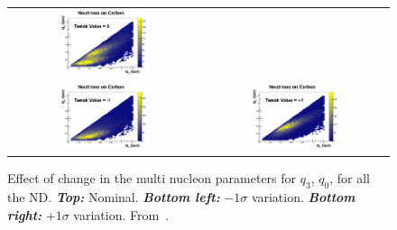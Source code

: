 \begin{figure}[ht]
  \begin{adjustbox}{center}
    \begin{tabular}{cc}
      \includegraphics[width=0.48\textwidth]{images/BANFF/neutrino_carbon_0.png} &\\
      \includegraphics[width=0.48\textwidth]{images/BANFF/neutrino_carbon_m3.png}&\includegraphics[width=0.48\textwidth]{images/BANFF/neutrino_carbon_p3.png}
    \end{tabular}
  \end{adjustbox}
  \begin{center}
    \caption[Effect of change in the multi nucleon parameters]{Effect
      of change in the multi nucleon parameters for $q_3$, $q_0$, for
      all the \Gls{ND}. \textbf{\textit{Top:}}
      Nominal. \textbf{\textit{Bottom left:}} $-1\sigma$ variation.
      \textbf{\textit{Bottom right:}} $+1\sigma$ variation.
      From~\cite{TN315}.}
    \label{fig:2p2herror}
  \end{center}
\end{figure}

